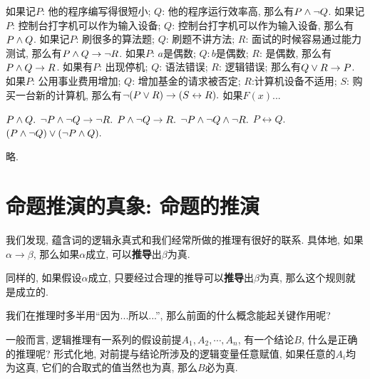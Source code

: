 \begin{multicols}{2}
        \begin{Answer}[ref={ex:proplogic}]
            \Question 
            \begin{tasks}
                \task 如果记$P$: 他的程序编写得很短小; $Q$: 他的程序运行效率高, 那么有$P\land \lnot Q$.               
                \task 如果记$P$: 控制台打字机可以作为输入设备; $Q$: 控制台打字机可以作为输入设备, 那么有$P\land Q$.   
                \task 如果记$P$: 刷很多的算法题; $Q$: 刷题不讲方法; $R$: 面试的时候容易通过能力测试, 那么有$P\land Q \to \lnot R$.
                	\task 如果$P$: $a$是偶数; $Q: b$是偶数; $R$: 是偶数, 那么有$P\land Q \to R$.
                	\task 如果有$P$: 出现停机; $Q$: 语法错误; $R$: 逻辑错误; 那么有$Q \lor R \to P$. 
                	\task 如果$P$: 公用事业费用增加; $Q$: 增加基金的请求被否定; $R$:计算机设备不适用; $S$: 购买一台新的计算机, 那么有$\lnot (P\lor R) \to (S \leftrightarrow R).$ 
                	\task 如果$F(x)$...
            \end{tasks} 
            \Question 
            \begin{tasks}
                \task $P\land Q.$
                \task $\lnot P \land \lnot Q \to \lnot R.$
                \task $P\land \lnot Q \to R.$
                \task $\lnot P \land \lnot Q \land \lnot R.$
                \task $P\leftrightarrow Q.$
                \task $(P \land \lnot Q)\lor (\lnot P \land Q).$
            \end{tasks} 
            	\Question 略.
        \end{Answer}
\end{multicols}

\section{命题推演的真象: 命题的推演}

我们发现, 蕴含词的逻辑永真式和我们经常所做的推理有很好的联系. 具体地, 如果$\alpha \to \beta$, 那么如果$\alpha$成立, 可以\textbf{推导}出$\beta$为真. 

同样的, 如果假设$\alpha$成立, 只要经过合理的推导可以\textbf{推导}出$\beta$为真, 那么这个规则就是成立的.  


我们在推理时多半用“因为...所以...”, 那么前面的什么概念能起关键作用呢?

一般而言, 逻辑推理有一系列的假设前提$A_1,A_2,\cdots,A_n$, 有一个结论$B$, 什么是正确的推理呢? 形式化地, 对前提与结论所涉及的逻辑变量任意赋值, 如果任意的$A_i$均为这真, 它们的合取式的值当然也为真, 那么$B$必为真. 

